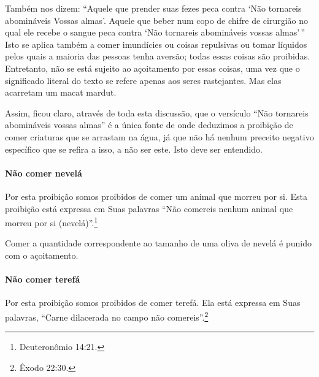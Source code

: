 \begin{multicols}{2}
Também nos dizem: ``Aquele que prender suas fezes peca contra `Não
tornareis abomináveis Vossas almas'. Aquele que beber num copo de chifre
de cirurgião no qual ele recebe o sangue peca contra `Não tornareis
abomináveis vossas almas'\,'' Isto se aplica também a comer imundícies ou
coisas repulsivas ou tomar líquidos pelos quais a maioria das pessoas
tenha aversão; todas essas coisas são proibidas. Entretanto, não se está
sujeito ao açoitamento por essas coisas, uma vez que o significado
literal do texto se refere apenas aos seres rastejantes. Mas elas
acarretam um macat mardut\starr.

Assim, ficou claro, através de toda esta discussão, que o versículo
``Não tornareis abomináveis vossas almas'' é a única fonte de onde
deduzimos a proibição de comer criaturas que se arrastam na água, já que
não há nenhum preceito negativo específico que se refira a isso, a não
ser este. Isto deve ser entendido.

\paragraph{Não comer nevelá\starr{}}

Por esta proibição somos proibidos de comer um animal que morreu por
si. Esta proibição está expressa em Suas palavras ``Não comereis nenhum
animal que morreu por si (nevelá\starr)''.\footnote{Deuteronômio 14:21.}

Comer a quantidade correspondente ao tamanho de uma oliva de nevelá\starr{}
é punido com o açoitamento.

\paragraph{Não comer terefá\starr{}}

Por esta proibição somos proibidos de comer terefá\starr. Ela está
expressa em Suas palavras, ``Carne dilacerada no campo não comereis''.\footnote{Êxodo 22:30.}


\end{multicols}
